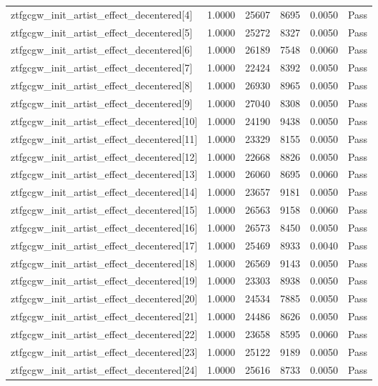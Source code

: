 \begin{table}[htbp]
\begin{tabular}{llrrll}
ztfgcgw\_init\_artist\_effect\_decentered[4] & 1.0000 & 25607 & 8695 & 0.0050 & Pass \\
ztfgcgw\_init\_artist\_effect\_decentered[5] & 1.0000 & 25272 & 8327 & 0.0050 & Pass \\
ztfgcgw\_init\_artist\_effect\_decentered[6] & 1.0000 & 26189 & 7548 & 0.0060 & Pass \\
ztfgcgw\_init\_artist\_effect\_decentered[7] & 1.0000 & 22424 & 8392 & 0.0050 & Pass \\
ztfgcgw\_init\_artist\_effect\_decentered[8] & 1.0000 & 26930 & 8965 & 0.0050 & Pass \\
ztfgcgw\_init\_artist\_effect\_decentered[9] & 1.0000 & 27040 & 8308 & 0.0050 & Pass \\
ztfgcgw\_init\_artist\_effect\_decentered[10] & 1.0000 & 24190 & 9438 & 0.0050 & Pass \\
ztfgcgw\_init\_artist\_effect\_decentered[11] & 1.0000 & 23329 & 8155 & 0.0050 & Pass \\
ztfgcgw\_init\_artist\_effect\_decentered[12] & 1.0000 & 22668 & 8826 & 0.0050 & Pass \\
ztfgcgw\_init\_artist\_effect\_decentered[13] & 1.0000 & 26060 & 8695 & 0.0060 & Pass \\
ztfgcgw\_init\_artist\_effect\_decentered[14] & 1.0000 & 23657 & 9181 & 0.0050 & Pass \\
ztfgcgw\_init\_artist\_effect\_decentered[15] & 1.0000 & 26563 & 9158 & 0.0060 & Pass \\
ztfgcgw\_init\_artist\_effect\_decentered[16] & 1.0000 & 26573 & 8450 & 0.0050 & Pass \\
ztfgcgw\_init\_artist\_effect\_decentered[17] & 1.0000 & 25469 & 8933 & 0.0040 & Pass \\
ztfgcgw\_init\_artist\_effect\_decentered[18] & 1.0000 & 26569 & 9143 & 0.0050 & Pass \\
ztfgcgw\_init\_artist\_effect\_decentered[19] & 1.0000 & 23303 & 8938 & 0.0050 & Pass \\
ztfgcgw\_init\_artist\_effect\_decentered[20] & 1.0000 & 24534 & 7885 & 0.0050 & Pass \\
ztfgcgw\_init\_artist\_effect\_decentered[21] & 1.0000 & 24486 & 8626 & 0.0050 & Pass \\
ztfgcgw\_init\_artist\_effect\_decentered[22] & 1.0000 & 23658 & 8595 & 0.0060 & Pass \\
ztfgcgw\_init\_artist\_effect\_decentered[23] & 1.0000 & 25122 & 9189 & 0.0050 & Pass \\
ztfgcgw\_init\_artist\_effect\_decentered[24] & 1.0000 & 25616 & 8733 & 0.0050 & Pass \\

\end{tabular}
\end{table}
